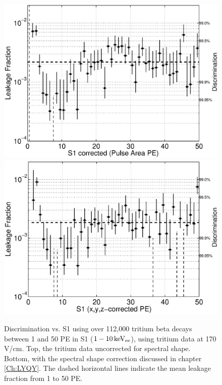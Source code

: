 \renewcommand{\baselinestretch}{1}
\small\normalsize
\begin{figure}[h!]\centering
\includegraphics[width=120mm]{Chapter_T/Figures/ER_Band/CH3T_Leakage_fid_50_rawSpec.eps}
\includegraphics[width=120mm]{Chapter_T/Figures/ER_Band/CH3T_Leakage_fid_50_.eps}
\caption{Discrimination vs. S1 using over 112,000 tritium beta decays between 1 and 50 PE in S1 ($\rm1-10 \, keV_{ee}$), using tritium data at 170 V/cm. Top, the tritium data uncorrected for spectral shape. Bottom, with the spectral shape correction discussed in chapter \ref{Ch:LYQY}. The dashed horizontal lines indicate the mean leakage fraction from 1 to 50 PE.}
\label{fig:Leak}
\end{figure}
\renewcommand{\baselinestretch}{2}
\small\normalsize


